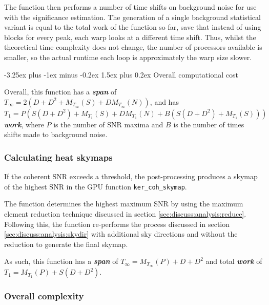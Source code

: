 \documentclass{article}
\makeatletter
\renewcommand{\paragraph}{\@startsection{paragraph}{4}{0ex}%
    {-3.25ex plus -1ex minus -0.2ex}%
    {1.5ex plus 0.2ex}%
    {\normalfont\normalsize\bfseries}}
\makeatother
\begin{document}
%
The function then performs a number of time shifts on background noise for use with the significance estimation.
The generation of a single background statistical variant is equal to the total work of the function so far, save that instead of using blocks for every peak, each warp looks at a different time shift.
Thus, whilst the theoretical time complexity does not change, the number of processors available is smaller, so the actual runtime each loop is approximately the warp size slower.

\paragraph{Overall computational cost} \label{sec:discuss:analysis:versatile_cost}

Overall, this function has a \textit{\textbf{span}} of \(T_\infty = 2(D + D^2 + M_{T_\infty}(S) + DM_{T_\infty}(N))\), and has \(T_1 = P(S(D + D^2) + M_{T_1}(S) + DM_{T_1}(N) + B(S(D + D^2) + M_{T_1}(S)))\) \textit{\textbf{work}}, where \(P\) is the number of SNR maxima and \(B\) is the number of times shifts made to background noise.

\subsubsection{Calculating heat skymaps} \label{sec:discuss:analysis:coh_skymap}

If the coherent SNR exceeds a threshold, the post-processing produces a skymap of the highest SNR in the GPU function \texttt{ker\_coh\_skymap}.

The function determines the highest maximum SNR by using the maximum element reduction technique discussed in section \ref{sec:discuss:analysis:reduce}.
Following this, the function re-performs the process discussed in section \ref{sec:discuss:analysis:skydir} with additional sky directions and without the reduction to generate the final skymap.

As such, this function has a \textit{\textbf{span}} of \(T_\infty = M_{T_\infty}(P) + D + D^2\) and total \textit{\textbf{work}} of \(T_1 = M_{T_1}(P) + S(D + D^2)\).

\subsubsection{Overall complexity} \label{sec:discuss:analysis:overall}
\end{document}
